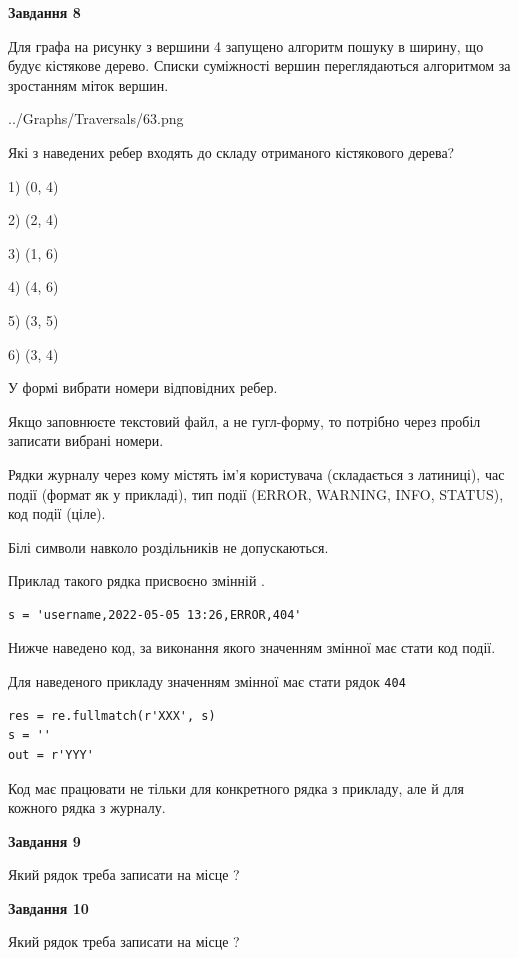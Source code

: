 \documentclass[12pt, ukrainian]{article}
\def\code#1{\Verb!#1!}
\begin{document}
{\begin {large}
{\begin {center}\textbf{Завдання 8}\end {center}}\par
Для графа на рисунку з вершини 4 запущено алгоритм пошуку в ширину, що будує кістякове дерево. Списки суміжності вершин переглядаються алгоритмом за зростанням міток вершин.\par
\begin{center}
	{../Graphs/Traversals/63.png}
\end{center}
\par Які з наведених ребер входять до складу отриманого кістякового дерева?\par
1) (0, 4)\par
2) (2, 4)\par
3) (1, 6)\par
4) (4, 6)\par
5) (3, 5)\par
6) (3, 4)\par
{\vskip 15pt} У формі вибрати номери відповідних ребер.


Якщо заповнюєте текстовий файл, а не гугл-форму, то потрібно через пробіл записа\-ти вибрані номери.\par
\newpage


Рядки журналу через кому містять ім'я користувача (складається з латиниці), час події (фор\-мат як у прикладі), тип події (ERROR, WARNING, INFO, STATUS), код події (ціле).

Білі символи навколо роздільників не допускаються.

Приклад такого рядка присвоєно змінній .



\begin{verbatim}
s = 'username,2022-05-05 13:26,ERROR,404'
\end{verbatim}


Нижче наведено код, за виконання якого значенням змінної  має стати код події.

Для наведеного прикладу значенням змінної  має стати рядок \code{404}



\begin{verbatim}
res = re.fullmatch(r'XXX', s)
s = ''
out = r'YYY'
\end{verbatim}


Код має працювати не тільки для конкретного рядка з прикладу, але й для кожного рядка з журналу.

{\begin {center}\textbf{Завдання 9}\end {center}}\par
Який рядок треба записати на місце  ?\par
\vspace{5mm}


{\begin {center}\textbf{Завдання 10}\end {center}}\par
Який рядок треба записати на місце  ?\par


\newpage


\end {large}}
\end{document}
